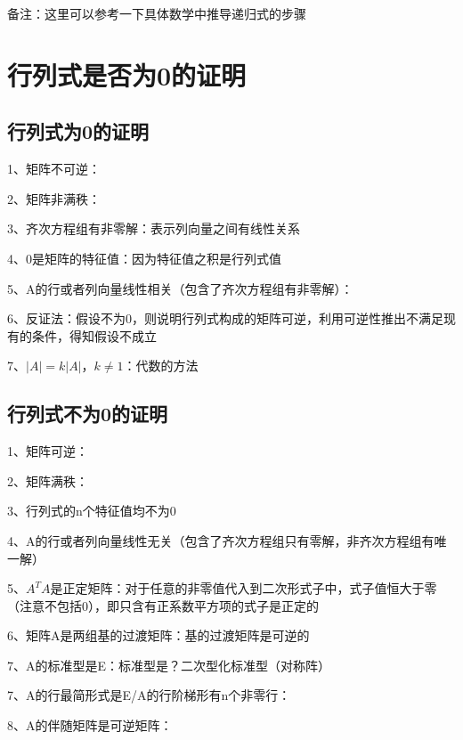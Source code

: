 备注：这里可以参考一下具体数学中推导递归式的步骤

\section{行列式是否为0的证明}



\subsection{行列式为0的证明}

1、矩阵不可逆：

2、矩阵非满秩：

3、齐次方程组有非零解：表示列向量之间有线性关系

4、0是矩阵的特征值：因为特征值之积是行列式值

5、A的行或者列向量线性相关（包含了齐次方程组有非零解）：

6、反证法：假设不为0，则说明行列式构成的矩阵可逆，利用可逆性推出不满足现有的条件，得知假设不成立

7、$|A|=k|A|$，$k\ne 1$：代数的方法



\subsection{行列式不为0的证明}

1、矩阵可逆：

2、矩阵满秩：

3、行列式的n个特征值均不为0

4、A的行或者列向量线性无关（包含了齐次方程组只有零解，非齐次方程组有唯一解）

5、$A^TA$是正定矩阵：对于任意的非零值代入到二次形式子中，式子值恒大于零（注意不包括0），即只含有正系数平方项的式子是正定的

6、矩阵A是两组基的过渡矩阵：基的过渡矩阵是可逆的

7、A的标准型是E：标准型是？二次型化标准型（对称阵）

7、A的行最简形式是E/A的行阶梯形有n个非零行：

8、A的伴随矩阵是可逆矩阵：


